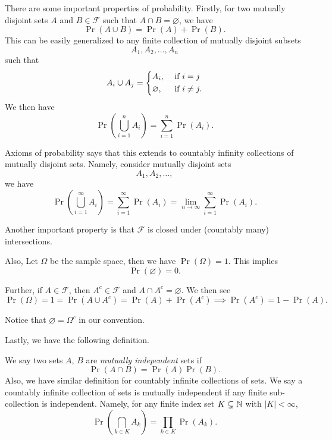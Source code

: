There are some important properties of probability. Firstly, for two mutually disjoint sets \(A\) and \(B\in\mathcal{F}\) such that \(A\cap B = \varnothing\), we have
\[
	\Pr(A\cup B) = \Pr(A) + \Pr(B).
\]
This can be easily generalized to any finite collection of mutually disjoint subsets
\[
	A_1, A_2, \ldots , A_n
\]
such that
\[
	A_i \cup A_j = \begin{dcases}
		A_i,         & \text{ if }i = j    \\
		\varnothing, & \text{ if }i\neq j.
	\end{dcases}
\]
We then have \[
	\Pr(\bigcup\limits_{i = 1}^n A_{i}) = \sum\limits_{i=1}^{n} \Pr(A_{i}).
\]
\begin{remark}
	Axioms of probability says that this extends to countably infinity collections of mutually disjoint sets. Namely, consider mutually disjoint sets
	\[
		A_1, A_2, \ldots,
	\]
	we have
	\[
		\Pr(\bigcup\limits_{i=1}^{\infty} A_{i}) = \sum\limits_{i=1}^{\infty} \Pr(A_{i}) = \lim_{n \to \infty} \sum\limits_{i=1}^{\infty} \Pr(A_{i}).
	\]

	Another important property is that \(\mathcal{F}\) is closed under (countably many) intersections.
\end{remark}

Also, Let \(\Omega\) be the sample space, then we have \(\Pr(\Omega) = 1\). This implies
\[
	\Pr(\varnothing ) = 0.
\]

Further, if \(A\in\mathcal{F}\), then \(A^{c}\in\mathcal{F}\) and \(A\cap A^{c}= \varnothing \). We then see
\[
	\Pr(\Omega) = 1 = \Pr(A\cup A^{c}) = \Pr(A) + \Pr(A^{c}) \implies \Pr(A^{c}) = 1 - \Pr(A).
\]

\begin{note}
	Notice that \(\varnothing  = \Omega^{c}\) in our convention.
\end{note}

Lastly, we have the following definition.
\begin{definition}\label{def:mutually-independent}
	We say two sets \(A\), \(B\) are \emph{mutually independent} sets if
	\[
		\Pr(A\cap B) = \Pr(A)\Pr(B).
	\]
	Also, we have similar definition for countably infinite collections of sets. We say a countably infinite collection of sets is mutually independent if
	any finite sub-collection is independent. Namely, for any finite index set \(K\subsetneq \mathbb{\MakeUppercase{N}}\) with \(\left\vert K \right\vert < \infty \),
	\[
		\Pr(\bigcap\limits_{k\in K} A_k) = \prod_{k\in K} \Pr(A_k).
	\]
\end{definition}

